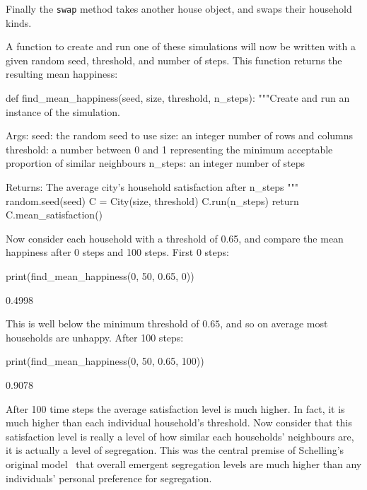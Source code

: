 Finally the \texttt{swap} method takes another house object, and
swaps their household kinds.

A function to create and run one of these simulations will now be written
with a given random seed, threshold, and number of steps. This function returns
the resulting mean happiness:

\begin{pyin}
def find_mean_happiness(seed, size, threshold, n_steps):
    """Create and run an instance of the simulation.

    Args:
        seed: the random seed to use
        size: an integer number of rows and columns
        threshold: a number between 0 and 1 representing
            the minimum acceptable proportion of similar
            neighbours
        n_steps: an integer number of steps

    Returns:
        The average city's household satisfaction after
        n_steps
    """
    random.seed(seed)
    C = City(size, threshold)
    C.run(n_steps)
    return C.mean_satisfaction()
\end{pyin}

Now consider each household with a threshold of
0.65, and compare the mean happiness after 0 steps and 100 steps.
First 0 steps:

\begin{pyin}
print(find_mean_happiness(0, 50, 0.65, 0))
\end{pyin}

\begin{pyout}
0.4998
\end{pyout}

This is well below the minimum threshold of \(0.65\), and so on average most
households are unhappy.
After 100 steps:

\begin{pyin}
print(find_mean_happiness(0, 50, 0.65, 100))
\end{pyin}

\begin{pyout}
0.9078
\end{pyout}

After 100 time steps the average satisfaction level is much higher.
In fact, it is much higher than each individual household's threshold.
Now consider that this satisfaction level is really a level of how similar
each households' neighbours are, it is actually a level of segregation.
This was the central premise of Schelling's original
model~\cite{schelling2006micromotives}
that overall
emergent segregation levels are much higher than any individuals' personal
preference for segregation.

